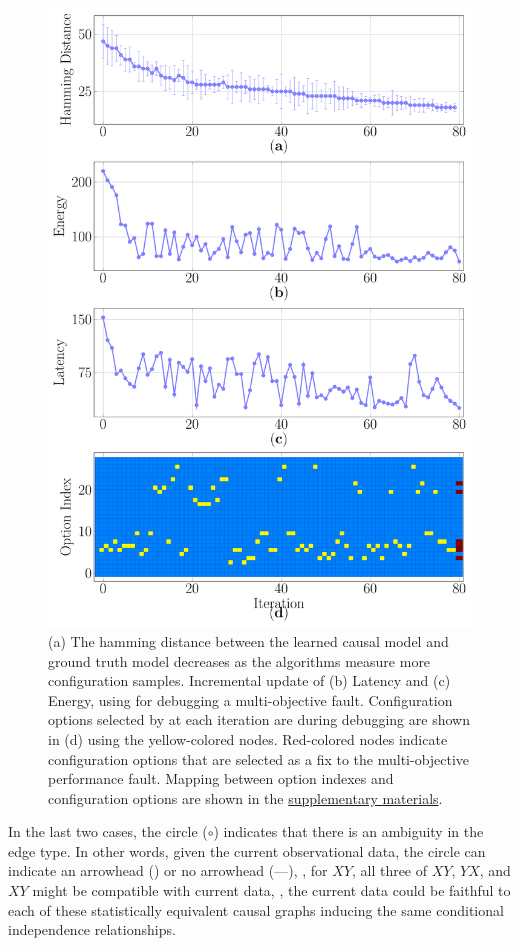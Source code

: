 \begin{figure}[tp!]
    \centering
    \includegraphics*[width=\linewidth]{figures-vg/incremental_update_conf.pdf}
    \caption{\small {(a) The hamming distance between the learned causal model and ground truth model decreases as the algorithms measure more configuration samples. Incremental update of (b) Latency and (c) Energy, using \ourapproach for debugging a multi-objective fault. Configuration options selected by \ourapproach at each iteration are during debugging are shown in (d) using the yellow-colored nodes. Red-colored nodes indicate configuration options that are selected as a fix to the multi-objective performance fault. Mapping between option indexes and configuration options are shown in the \href{https://github.com/softsys4ai/unicorn}{\color{blue!80}supplementary materials}.}}
   
    \label{fig:incremental_update}
\end{figure}
\noindent In the last two cases, the circle ($\circ$) indicates that there is an ambiguity in the edge type. In other words, given the current observational data, the circle can indicate an arrowhead (\edgeone) or no arrowhead (---), \ie, for $X$\edgefour$Y$, all three of $X$\edgeone$Y$, $Y$\edgeone$X$, and $X$\edgetwo$Y$ might be compatible with current data, \ie, the current data could be faithful to each of these statistically equivalent causal graphs inducing the same conditional independence relationships.



